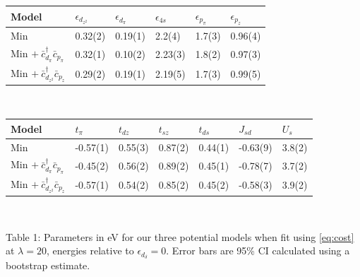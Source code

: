 \documentclass[12pt]{article}
\begin{document}
\begin{table}[H]
\begin{center}
\begin{tabular}{l|lllll}
Model &$\epsilon_{d_{z^2}}$ & $\epsilon_{d_\pi}$ & $\epsilon_{4s}$ & $\epsilon_{p_\pi}$ & $\epsilon_{p_z}$ \\ \hline 
Min & 0.32(2)& 0.19(1)& 2.2(4)& 1.7(3)& 0.96(4)\\
Min $ +\ \bar{c}_{d_\pi}^\dagger \bar{c}_{p_\pi}$& 0.32(1)& 0.10(2)& 2.23(3)& 1.8(2)& 0.97(3)\\
Min $ +\ \bar{c}_{d_{z^2}}^\dagger \bar{c}_{p_z}$& 0.29(2)& 0.19(1)& 2.19(5)& 1.7(3)& 0.99(5)\\
\end{tabular} \\

\begin{tabular}{l|llllll}
Model &$t_\pi$ & $t_{dz}$ & $t_{sz}$ & $t_{ds}$ & $J_{sd}$ & $U_s$ \\ \hline 
Min &  -0.57(1)& 0.55(3)& 0.87(2)& 0.44(1)& -0.63(9)& 3.8(2)\\
Min $ +\ \bar{c}_{d_\pi}^\dagger \bar{c}_{p_\pi}$& -0.45(2)& 0.56(2)& 0.89(2)& 0.45(1)& -0.78(7)& 3.7(2)\\
Min $ +\ \bar{c}_{d_{z^2}}^\dagger \bar{c}_{p_z}$& -0.57(1)& 0.54(2)& 0.85(2)& 0.45(2)& -0.58(3)& 3.9(2)\\
\end{tabular} \\

\end{center}
Table 1: Parameters in eV for our three potential models when fit using \eqref{eq:cost} at $\lambda = 20$, energies relative to $\epsilon_{d_\delta} = 0$. Error bars are 95\% CI calculated using a bootstrap estimate.
\end{table}
\end{document}
